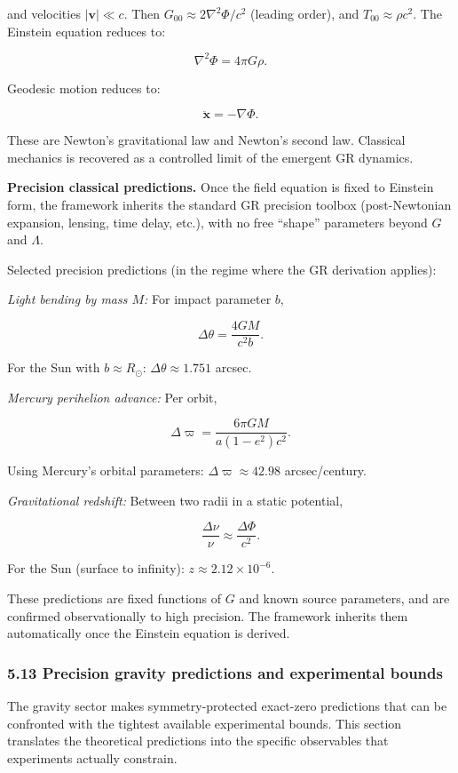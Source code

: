 \documentclass[
]{article}
\begin{document}
and velocities \(|\mathbf{v}| \ll c\). Then
\(G_{00} \approx 2\nabla^2\Phi/c^2\) (leading order), and
\(T_{00} \approx \rho c^2\). The Einstein equation reduces to:

\[
\nabla^2 \Phi = 4\pi G \rho.
\]

Geodesic motion reduces to:

\[
\ddot{\mathbf{x}} = -\nabla \Phi.
\]

These are Newton's gravitational law and Newton's second law. Classical
mechanics is recovered as a controlled limit of the emergent GR
dynamics.

\textbf{Precision classical predictions.} Once the field equation is
fixed to Einstein form, the framework inherits the standard GR precision
toolbox (post-Newtonian expansion, lensing, time delay, etc.), with no
free ``shape'' parameters beyond \(G\) and \(\Lambda\).

Selected precision predictions (in the regime where the GR derivation
applies):

\emph{Light bending by mass \(M\):} For impact parameter \(b\),

\[
\Delta\theta = \frac{4GM}{c^2 b}.
\]

For the Sun with \(b \approx R_\odot\): \(\Delta\theta \approx 1.751\)
arcsec.

\emph{Mercury perihelion advance:} Per orbit,

\[
\Delta\varpi = \frac{6\pi GM}{a(1-e^2)c^2}.
\]

Using Mercury's orbital parameters: \(\Delta\varpi \approx 42.98\)
arcsec/century.

\emph{Gravitational redshift:} Between two radii in a static potential,

\[
\frac{\Delta\nu}{\nu} \approx \frac{\Delta\Phi}{c^2}.
\]

For the Sun (surface to infinity): \(z \approx 2.12 \times 10^{-6}\).

These predictions are fixed functions of \(G\) and known source
parameters, and are confirmed observationally to high precision. The
framework inherits them automatically once the Einstein equation is
derived.

\subsubsection{5.13 Precision gravity predictions and experimental
bounds}\label{precision-gravity-predictions-and-experimental-bounds}

The gravity sector makes symmetry-protected exact-zero predictions that
can be confronted with the tightest available experimental bounds. This
section translates the theoretical predictions into the specific
observables that experiments actually constrain.
\end{document}
